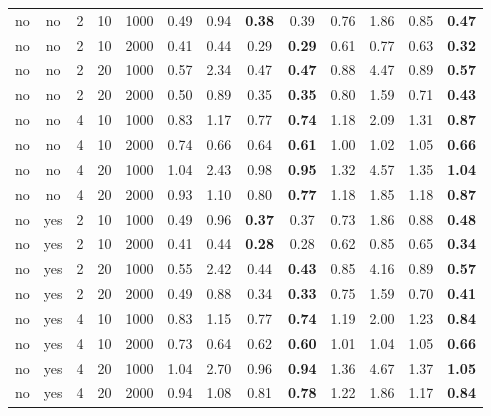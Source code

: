 \begin{table}[ht]
\begin{tabular}{||cc|rrr||cccc|cccc||}
   \hline
\hline
no & no & 2 & 10 & 1000 & 0.49 & 0.94 & \bf 0.38 & 0.39 & 0.76 & 1.86 & 0.85 & \bf 0.47 \\ 
  no & no & 2 & 10 & 2000 & 0.41 & 0.44 & 0.29 & \bf 0.29 & 0.61 & 0.77 & 0.63 & \bf 0.32 \\ 
  no & no & 2 & 20 & 1000 & 0.57 & 2.34 & 0.47 & \bf 0.47 & 0.88 & 4.47 & 0.89 & \bf 0.57 \\ 
  no & no & 2 & 20 & 2000 & 0.50 & 0.89 & 0.35 & \bf 0.35 & 0.80 & 1.59 & 0.71 & \bf 0.43 \\ 
   \hline
no & no & 4 & 10 & 1000 & 0.83 & 1.17 & 0.77 & \bf 0.74 & 1.18 & 2.09 & 1.31 & \bf 0.87 \\ 
  no & no & 4 & 10 & 2000 & 0.74 & 0.66 & 0.64 & \bf 0.61 & 1.00 & 1.02 & 1.05 & \bf 0.66 \\ 
  no & no & 4 & 20 & 1000 & 1.04 & 2.43 & 0.98 & \bf 0.95 & 1.32 & 4.57 & 1.35 & \bf 1.04 \\ 
  no & no & 4 & 20 & 2000 & 0.93 & 1.10 & 0.80 & \bf 0.77 & 1.18 & 1.85 & 1.18 & \bf 0.87 \\ 
   \hline
no & yes & 2 & 10 & 1000 & 0.49 & 0.96 & \bf 0.37 & 0.37 & 0.73 & 1.86 & 0.88 & \bf 0.48 \\ 
  no & yes & 2 & 10 & 2000 & 0.41 & 0.44 & \bf 0.28 & 0.28 & 0.62 & 0.85 & 0.65 & \bf 0.34 \\ 
  no & yes & 2 & 20 & 1000 & 0.55 & 2.42 & 0.44 & \bf 0.43 & 0.85 & 4.16 & 0.89 & \bf 0.57 \\ 
  no & yes & 2 & 20 & 2000 & 0.49 & 0.88 & 0.34 & \bf 0.33 & 0.75 & 1.59 & 0.70 & \bf 0.41 \\ 
   \hline
no & yes & 4 & 10 & 1000 & 0.83 & 1.15 & 0.77 & \bf 0.74 & 1.19 & 2.00 & 1.23 & \bf 0.84 \\ 
  no & yes & 4 & 10 & 2000 & 0.73 & 0.64 & 0.62 & \bf 0.60 & 1.01 & 1.04 & 1.05 & \bf 0.66 \\ 
  no & yes & 4 & 20 & 1000 & 1.04 & 2.70 & 0.96 & \bf 0.94 & 1.36 & 4.67 & 1.37 & \bf 1.05 \\ 
  no & yes & 4 & 20 & 2000 & 0.94 & 1.08 & 0.81 & \bf 0.78 & 1.22 & 1.86 & 1.17 & \bf 0.84 \\ 
   \hline
\hline
\end{tabular}
\end{table}
